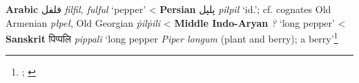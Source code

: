 \begin{etymology}\label{ety:fulful}
\textbf{Arabic} {فلفل} \textit{filfil, fulful} `pepper'
< \textbf{Persian} {پلپل} \textit{pilpil} `id.'; cf. cognates Old Armenian  \textit{płpeł}, Old Georgian  \textit{ṗilṗili}
< \textbf{Middle Indo-Aryan} \textit{?} `long pepper'
< \textbf{Sanskrit} {पिप्पलि } \textit{pippali} `long pepper \textit{Piper longum} (plant and berry); a berry'\footnote{\textcite[2434]{lane_arabic-english_1863}; \textcite{sq}}
\end{etymology}